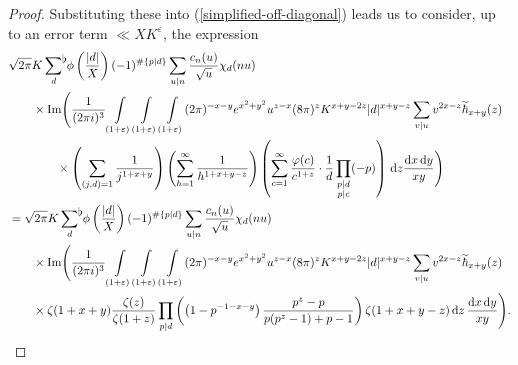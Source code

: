 \documentclass[a4paper,10pt,twoside]{amsart}
\theoremstyle{definition}
\numberwithin{equation}{section}
\newcommand\eps{\varepsilon}
\renewcommand{\Im}{\textnormal{Im}}
\renewcommand\:{\colon}
\newcommand{\sumflat}{\mathop{{\sum}^{\raisebox{-3pt}{\makebox[0pt][l]{$\flat$}}}}}
\begin{document}
\begin{proof}
Substituting these into (\ref{simplified-off-diagonal}) leads us to consider, up to an error term $\ll XK^\eps$, the expression
\begin{align}\label{zeta-int}
&\sqrt{2\pi}K\sumflat_d\,\phi\left(\frac{|d|}X\right)(-1)^{\#\{p|d\}}\sum_{u|n}\frac{c_n(u)}{\sqrt u}\chi_d(nu) \nonumber \\
& \qquad\times\Im\Bigg(\frac1{(2\pi i)^3}\int\limits_{(1+\eps)}\int\limits_{(1+\eps)}\int\limits_{(1+\varepsilon)}(2\pi)^{-x-y}e^{x^2+y^2}u^{z-x}(8\pi)^zK^{x+y-2z}|d|^{x+y-z}\sum_{v|u}v^{2x-z}\widetilde\hbar_{x+y}(z) \nonumber\\
&\qquad\qquad\times\left(\sum_{(j,d)=1}\frac1{j^{1+x+y}}\right)\left(\sum_{h=1}^\infty\frac1{h^{1+x+y-z}}\right)\left(\sum_{c=1}^\infty\frac{\varphi(c)}{c^{1+z}}\cdot\frac1d\prod_{\substack{p|d\\
p|c}}(-p)\right)\,\mathrm d z\frac{\mathrm d x\,\mathrm d y}{xy}\Bigg) \nonumber\\
&=\sqrt{2\pi}K\sumflat_d\,\phi\left(\frac{|d|}X\right)(-1)^{\#\{p|d\}}\sum_{u|n}\frac{c_n(u)}{\sqrt u}\chi_d(nu)\nonumber \\
&\qquad\times\Im\Bigg(\frac1{(2\pi i)^3}\int\limits_{(1+\eps)}\int\limits_{(1+\eps)}\int\limits_{(1+\varepsilon)} (2\pi)^{-x-y}e^{x^2+y^2}u^{z-x}(8\pi)^zK^{x+y-2z}|d|^{x+y-z}\sum_{v|u}v^{2x-z}\widetilde\hbar_{x+y}(z) \nonumber \\
&\qquad\times\zeta(1+x+y)\frac{\zeta(z)}{\zeta(1+z)}\prod_{p|d}\left(\left(1-p^{-1-x-y}\right)\frac{p^{z}-p}{p(p^{z}-1)+p-1}\right)\zeta(1+x+y-z)\,\mathrm d z\,\frac{\mathrm d x\,\mathrm d y}{xy}\Bigg).
\end{align}






\end{proof}
\end{document}
